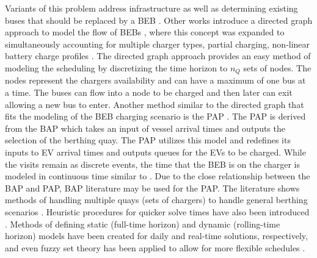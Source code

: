 \documentclass[ee,thesis]{usuthesis}
\begin{document}
Variants of this problem address infrastructure as well as determining existing buses that should be replaced by a BEB
\cite{zhou-2020-bi-objec,duan-2021-refor-mixed,rinaldi-2020-mixed-fleet,zhou-2020-collab-optim}. Other works
introduce a directed graph approach to model the flow of BEBs \cite{whitaker-2023-a-network,liu-2020-batter-elect},
where this concept was expanded to simultaneously accounting for multiple charger types, partial charging, non-linear
battery charge profiles \cite{whitaker-2023-a-network}. The directed graph approach provides an easy method of modeling
the scheduling by discretizing the time horizon to \(n_Q\) sets of nodes. The nodes represent the chargers availability
and can have a maximum of one bus at a time. The buses can flow into a node to be charged and then later can exit
allowing a new bus to enter. Another method similar to the directed graph that fits the modeling of the BEB charging
scenario is the PAP \cite{qarebagh-2019-optim-sched}. The PAP is derived from the BAP which takes an input of vessel
arrival times and outputs the selection of the berthing quay. The PAP utilizes this model and redefines its inputs to EV
arrival times and outputs queues for the EVs to be charged. While the visits remain as discrete events, the time that
the BEB is on the charger is modeled in continuous time similar to \cite{frojan-2015-contin-berth,qarebagh-2019-optim-sched,zhou-2020-collab-optim}. Due to the close relationship between the BAP and PAP, BAP
literature may be used for the PAP. The literature shows methods of handling multiple quays (sets of chargers) to handle
general berthing scenarios \cite{frojan-2015-contin-berth,dai-2008-suppl-chain-analy}. Heuristic procedures for
quicker solve times have also been introduced \cite{imai-2001-dynam-berth}. Methods of defining static (full-time
horizon) and dynamic (rolling-time horizon) models have been created for daily and real-time solutions, respectively,
and even fuzzy set theory has been applied to allow for more flexible schedules \cite{bello-2019-fuzzy-activ}.
\end{document}
